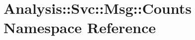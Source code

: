 \hypertarget{namespaceAnalysis_1_1Svc_1_1Msg_1_1Counts}{}\section{Analysis\+:\+:Svc\+:\+:Msg\+:\+:Counts Namespace Reference}
\label{namespaceAnalysis_1_1Svc_1_1Msg_1_1Counts}
